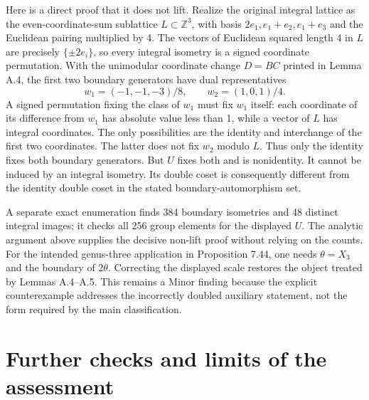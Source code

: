 \documentclass[10pt]{article}
\begin{document}
Here is a direct proof that it does not lift. Realize the original integral lattice as the even-coordinate-sum sublattice \(L\subset\mathbb Z^3\), with basis \(2e_1,e_1+e_2,e_1+e_3\) and the Euclidean pairing multiplied by 4. The vectors of Euclidean squared length 4 in \(L\) are precisely \(\{\pm2e_i\}\), so every integral isometry is a signed coordinate permutation. With the unimodular coordinate change \(D=BC\) printed in Lemma A.4, the first two boundary generators have dual representatives \[w_1=(-1,-1,-3)/8,\qquad w_2=(1,0,1)/4.\] A signed permutation fixing the class of \(w_1\) must fix \(w_1\) itself: each coordinate of its difference from \(w_1\) has absolute value less than 1, while a vector of \(L\) has integral coordinates. The only possibilities are the identity and interchange of the first two coordinates. The latter does not fix \(w_2\) modulo \(L\). Thus only the identity fixes both boundary generators. But \(U\) fixes both and is nonidentity. It cannot be induced by an integral isometry. Its double coset is consequently different from the identity double coset in the stated boundary-automorphism set.\par
A separate exact enumeration finds 384 boundary isometries and 48 distinct integral images; it checks all 256 group elements for the displayed \(U\). The analytic argument above supplies the decisive non-lift proof without relying on the counts. For the intended genus-three application in Proposition 7.44, one needs \(\theta=X_3\) and the boundary of \(2\theta\). Correcting the displayed scale restores the object treated by Lemmas A.4–A.5. This remains a Minor finding because the explicit counterexample addresses the incorrectly doubled auxiliary statement, not the form required by the main classification.\par
\section*{Further checks and limits of the assessment}
\end{document}
